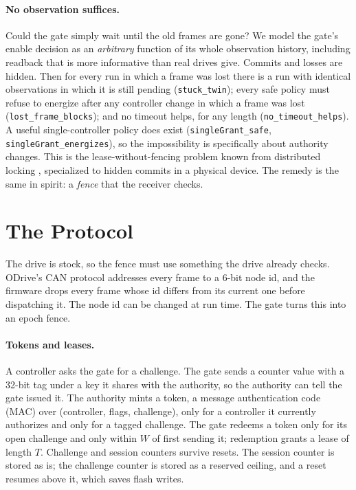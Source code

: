 \documentclass[letterpaper]{article} %
\newcommand{\code}[1]{\texttt{#1}}
\begin{document}
\paragraph{No observation suffices.} Could the gate simply wait until the old frames are gone?
We model the gate's enable decision as an \emph{arbitrary} function of its whole observation
history, including readback that is more informative than real drives give. Commits and losses
are hidden. Then for every run in which a frame was lost there is a run with identical
observations in which it is still pending (\code{stuck\_twin}); every safe policy must refuse to
energize after any controller change in which a frame was lost (\code{lost\_frame\_blocks}); and
no timeout helps, for any length (\code{no\_timeout\_helps}). A useful single-controller policy
does exist (\code{singleGrant\_safe}, \code{singleGrant\_energizes}), so the impossibility is
specifically about authority changes. This is the lease-without-fencing problem known from
distributed locking \citep{burrows2006chubby,kleppmann2016locking}, specialized to hidden commits
in a physical device. The remedy is the same in spirit: a \emph{fence} that the receiver checks.

\section{The Protocol}
\label{sec:protocol}

The drive is stock, so the fence must use something the drive already checks. ODrive's CAN
protocol addresses every frame to a 6-bit node id, and the firmware drops every frame whose id
differs from its current one before dispatching it. The node id can be changed at run time. The
gate turns this into an epoch fence.

\paragraph{Tokens and leases.} A controller asks the gate for a challenge. The gate sends a
counter value with a 32-bit tag under a key it shares with the authority, so the authority can tell
the gate issued it. The authority mints a token, a message authentication code (MAC) over
(controller, flags, challenge), only for
a controller it currently authorizes and only for a tagged challenge. The gate redeems a token only
for its open challenge and only within $W$ of first sending it; redemption grants a lease of
length $T$. Challenge and session counters survive resets. The session counter is stored as is;
the challenge counter is stored as a reserved ceiling, and a reset resumes above it, which saves
flash writes.
\end{document}
